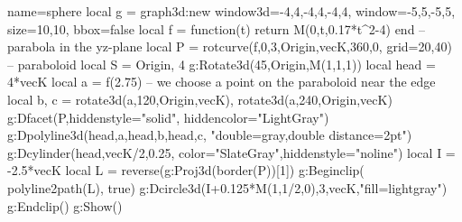 \documentclass[border=5pt]{standalone}
\begin{document}
\begin{luadraw}{name=sphere}
    local g = graph3d:new{
        window3d={-4,4,-4,4,-4,4},
        window={-5,5,-5,5},
        size={10,10}, bbox=false
    }
    local f = function(t) return M(0,t,0.17*t^2-4) end -- parabola in the yz-plane
    local P = rotcurve(f,0,3,{Origin,vecK},360,0, {grid={20,40}})  -- paraboloid
    local S = {Origin, 4}
    g:Rotate3d(45,{Origin,M(1,1,1)})
    local head = 4*vecK
    local a = f(2.75) -- we choose a point on the paraboloid near the edge
    local b, c = rotate3d(a,120,{Origin,vecK}), rotate3d(a,240,{Origin,vecK})
    g:Dfacet(P,{hiddenstyle="solid", hiddencolor="LightGray"})
    g:Dpolyline3d({{head,a},{head,b},{head,c}}, "double=gray,double distance=2pt")
    g:Dcylinder(head,vecK/2,0.25, {color="SlateGray",hiddenstyle="noline"})
    local I = -2.5*vecK
    local L = reverse(g:Proj3d(border(P))[1])
    g:Beginclip( polyline2path(L), true)
        g:Dcircle3d(I+0.125*M(1,1/2,0),3,vecK,"fill=lightgray")
    g:Endclip()
    g:Show()
\end{luadraw}
\end{document}
